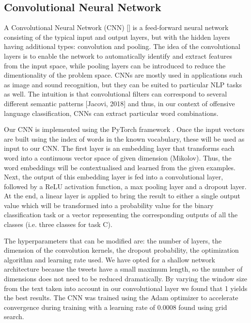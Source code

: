 \documentclass[11pt,a4paper]{article}
\begin{document}
\subsection{Convolutional Neural Network}

A Convolutional Neural Network (CNN) [] is a feed-forward neural network consisting of the typical input and output layers, but with the hidden layers having additional types: convolution and pooling. The idea of the convolutional layers is to enable the network to automatically identify and extract features from the input space, while pooling layers can be introduced to reduce the dimentionality of the problem space. CNNs are mostly used in applications such as image and sound recognition, but they can be suited to particular NLP tasks as well. The intuition is that convolutional filters can correspond to several different semantic patterns [Jacovi, 2018] and thus, in our context of offensive language classification, CNNs can extract particular word combinations.

Our CNN is implemented using the PyTorch framework \cite{pytorch}. Once the input vectors are built using the index of words in the known vocabulary, these will be used as input to our CNN. The first layer is an embedding layer that transforms each word into a continuous vector space of given dimension (Mikolov). Thus, the word embeddings will be contextualised and learned from the given examples. Next, the output of this embedding layer is fed into a convolutional layer, followed by a ReLU activation function, a max pooling layer and a dropout layer. At the end, a linear layer is applied to bring the result to either a single output value which will be transformed into a probability value for the binary classification task or a vector representing the corresponding outputs of all the classes (i.e. three classes for task C).

The hyperparameters that can be modified are: the number of layers, the dimension of the convolution kernels, the dropout probability, the optimization algorithm and learning rate used. We have opted for a shallow network architecture because the tweets have a small maximum length, so the number of dimensions does not need to be reduced dramatically. By varying the window size from the text taken into account in our convolutional layer we found that 1 yields the best results. The CNN was trained using the Adam optimizer \cite{adam} to accelerate convergence during training with a learning rate of 0.0008 found using grid search.
\end{document}
